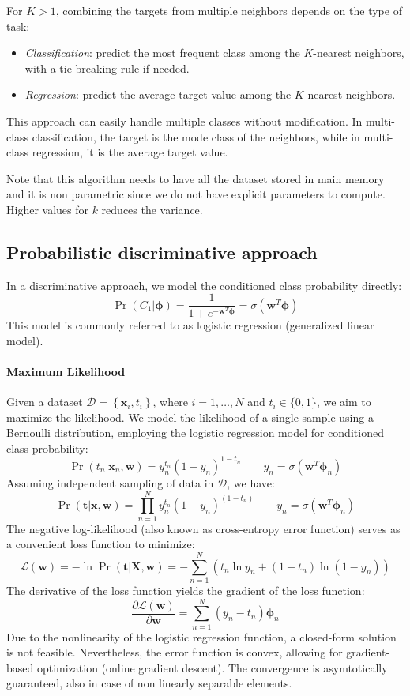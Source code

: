 For $K > 1$, combining the targets from multiple neighbors depends on the type of task:
\begin{itemize}
    \item \textit{Classification}: predict the most frequent class among the $K$-nearest neighbors, with a tie-breaking rule if needed.
    \item \textit{Regression}: predict the average target value among the $K$-nearest neighbors.
\end{itemize}
This approach can easily handle multiple classes without modification. 
In multi-class classification, the target is the mode class of the neighbors, while in multi-class regression, it is the average target value.

Note that this algorithm needs to have all the dataset stored in main memory and it is non parametric since we do not have explicit parameters to compute. 
Higher values for $k$ reduces the variance.

\subsection{Probabilistic discriminative approach}
In a discriminative approach, we model the conditioned class probability directly:
\[\Pr(C_1|\boldsymbol{\phi})=\dfrac{1}{1+e^{-\textbf{w}^T\boldsymbol{\phi}}}=\sigma(\textbf{w}^T\boldsymbol{\phi})\]
This model is commonly referred to as logistic regression (generalized linear model).

\paragraph*{Maximum Likelihood}
Given a dataset $\mathcal{D}=\left\{ \textbf{x}_i,t_i \right\}$, where $i=1,\dots,N$ and $t_i \in \{0,1\}$, we aim to maximize the likelihood.
We model the likelihood of a single sample using a Bernoulli distribution, employing the logistic regression model for conditioned class probability:
\[\Pr(t_n|\textbf{x}_n,\textbf{w})=y_n^{t_n}{\left( 1-y_n \right)}^{1-t_n} \qquad y_n=\sigma(\textbf{w}^T\boldsymbol{\phi}_n)\]
Assuming independent sampling of data in $\mathcal{D}$, we have:
\[\Pr(\textbf{t}|\textbf{x},\textbf{w})=\prod_{n=1}^N y_n^{t_n}{\left( 1-y_n \right)}^{(1-t_n)} \qquad y_n=\sigma(\textbf{w}^T\boldsymbol{\phi}_n)\]
The negative log-likelihood (also known as cross-entropy error function) serves as a convenient loss function to minimize:
\[\mathcal{L}(\textbf{w})=-\ln \Pr(\textbf{t}|\textbf{X},\textbf{w})=-\sum_{n=1}^N \left( t_n\ln y_n +(1-t_n) \ln (1-y_n) \right)\]
The derivative of the loss function yields the gradient of the loss function:
\[\dfrac{\partial\mathcal{L}(\textbf{w})}{\partial\mathbf{w}}=\sum_{n=1}^N\left( y_n-t_n \right) \boldsymbol{\phi}_n\]
Due to the nonlinearity of the logistic regression function, a closed-form solution is not feasible. 
Nevertheless, the error function is convex, allowing for gradient-based optimization (online gradient descent).
The convergence is asymtotically guaranteed, also in case of non linearly separable elements. 

